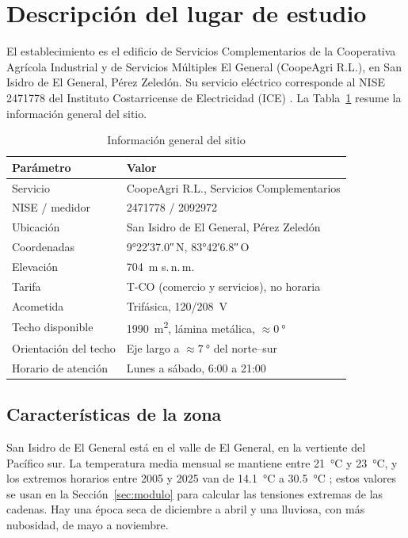 \section{Descripción del lugar de estudio}\label{sec:lugar}

El establecimiento es el edificio de Servicios Complementarios de la Cooperativa Agrícola Industrial y de Servicios Múltiples El General (CoopeAgri R.L.), en San Isidro de El General, Pérez Zeledón. Su servicio eléctrico corresponde al NISE 2471778 del Instituto Costarricense de Electricidad (ICE) \cite{ice_facturas}. La Tabla~\ref{tab:sitio} resume la información general del sitio.

\begin{table}[!htb]
\caption{Información general del sitio}
\label{tab:sitio}
\centering
\footnotesize
\setlength{\tabcolsep}{3pt}
\begin{tabular}{l l}
\toprule
Parámetro & Valor \\
\midrule
Servicio & CoopeAgri R.L., Servicios Complementarios \\
NISE / medidor & 2471778 / 2092972 \\
Ubicación & San Isidro de El General, Pérez Zeledón \\
Coordenadas & \ang{9;22;37.0}\,N, \ang{83;42;6.8}\,O \\
Elevación & \SI{704}{m} s.\,n.\,m. \\
Tarifa & T-CO (comercio y servicios), no horaria \\
Acometida & Trifásica, 120/\SI{208}{V} \\
Techo disponible & \SI{1990}{m^2}, lámina metálica, $\approx\SI{0}{\degree}$ \\
Orientación del techo & Eje largo a $\approx\SI{7}{\degree}$ del norte--sur \\
Horario de atención & Lunes a sábado, 6:00 a 21:00 \\
\bottomrule
\end{tabular}
\end{table}

\subsection{Características de la zona}

San Isidro de El General está en el valle de El General, en la vertiente del Pacífico sur. La temperatura media mensual se mantiene entre \SI{21}{\celsius} y \SI{23}{\celsius}, y los extremos horarios entre 2005 y 2025 van de \SI{14.1}{\celsius} a \SI{30.5}{\celsius} \cite{nasa_power, nasa_power_horario}; estos valores se usan en la Sección~\ref{sec:modulo} para calcular las tensiones extremas de las cadenas. Hay una época seca de diciembre a abril y una lluviosa, con más nubosidad, de mayo a noviembre.

